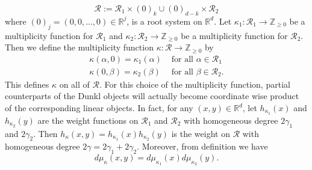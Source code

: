 \documentclass[a4paper,11pt, reqno]{amsart}
\theoremstyle{definition}
\theoremstyle{remark}
\numberwithin{equation}{section}
\begin{document}
	$$
	\mathcal{R}:=\mathcal{R}_1 \times(0)_{k} \cup(0)_{d-k} \times \mathcal{R}_2 
	$$
	where $(0)_j=(0,0, \ldots, 0) \in \mathbb{R}^j$, is a root system on $\mathbb{R}^{d}$. Let $\kappa_1: \mathcal{R}_1 \rightarrow \mathbb{Z}_{\geq 0}$ be a multiplicity function for $\mathcal{R}_1$ and $\kappa_2: \mathcal{R}_2 \rightarrow \mathbb{Z}_{\geq 0}$ be a multiplicity function for $\mathcal{R}_2$. Then we  define the multiplicity function $\kappa: \mathcal{R} \rightarrow \mathbb{Z}_{\geq 0}$ by$$
	\begin{array}{ll}
		\kappa(\alpha, 0)=\kappa_1(\alpha) & \text { for all } \alpha \in \mathcal{R}_1 \\
		\kappa(0, \beta)=\kappa_2(\beta) & \text { for all } \beta \in \mathcal{R}_2.
	\end{array}
	$$
	This defines $\kappa$ on all of $\mathcal{R}$. For this choice of the multiplicity function, partial counterparts of the Dunkl objects will actually become coordinate wise product of the corresponding linear objects. In fact, for any $(x, y)\in \mathbb{R}^{d}$, let $h_{\kappa_1}(x)$ and $h_{\kappa_2}(y)$ are the
	weight functions on $\mathcal{R}_1$ and $\mathcal{R}_2$ with homogeneous degree $2\gamma_1$ and  $2\gamma_2$.  Then $h_{\kappa}(x, y)=h_{\kappa_1}(x) h_{\kappa_2}(y)$ is the weight on $\mathcal{R}$  with homogeneous degree $2\gamma=2\gamma_1+2\gamma_2$. Moreover,  from definition we have
	$$
	d \mu_{\kappa}\left(x, y\right)=d \mu_{\kappa_1} (x ) d \mu_{\kappa_2} (y ). 
	$$
	
\end{document}

